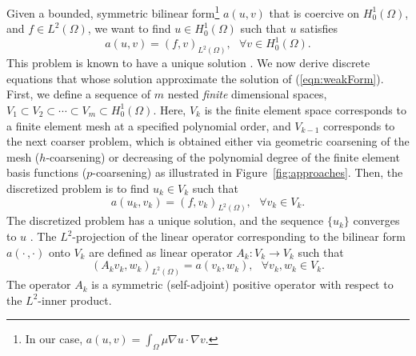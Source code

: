 \documentclass[smallcondensed,final]{svjour3}     %
\begin{document}
Given a bounded, symmetric bilinear form\footnote{In our case,
  $a(u,v)=\int_\Omega \mu\nabla u \cdot \nabla v$.} $a(u,v)$ that is
coercive
on $H_0^{1}(\Omega)$, and $f \in L^{2}(\Omega)$, we want to find $u
\in H_0^{1}(\Omega)$ such that $u$ satisfies
\begin{equation}
\label{eqn:weakForm}
a(u,v) =  (f,v)_{L^2(\Omega)}, \ \ \ \forall v \in H_0^{1}(\Omega).
\end{equation}
This problem is known to have a unique solution \cite{BrennerScott94}. 
We now derive discrete equations that whose solution 
approximate the solution of
(\ref{eqn:weakForm}). First, we define a sequence of $m$ nested {\em finite}
dimensional spaces, $V_1 \subset V_2 \subset \cdots \subset V_m \subset
H_0^{1}(\Omega)$.
Here, $V_k$ is the finite element space corresponds to a finite element mesh
at a specified
polynomial order, and $V_{k-1}$ corresponds to the next coarser
problem, which is obtained either via geometric coarsening of the
mesh ($h$-coarsening) or decreasing of the polynomial degree of the
finite element basis functions ($p$-coarsening) as illustrated in
Figure~\ref{fig:approaches}.  Then, the discretized problem is to find
$u_k \in V_k$ such that
\begin{equation*}
a(u_{k},v_k) = (f,v_k)_{L^2(\Omega)}, \ \ \ \forall v_k \in V_k.
\end{equation*}
The discretized problem has a unique solution, and the sequence
$\{u_k\}$ converges to $u$ \cite{BrennerScott94}.
%
The $L^2$-projection of the linear operator corresponding to the
bilinear form $a(\cdot\,,\cdot)$ onto $V_k$ are defined as linear
operator $A_k : V_{k} \rightarrow V_{k}$ such that
\begin{equation}
\label{eqn:fematDef}
(A_{k} v_k,w_k)_{L^2(\Omega)} = a(v_k,w_k),  \ \ \ \forall v_k,w_k \in V_k.
\end{equation}
The operator $A_k$ is a symmetric (self-adjoint) positive operator
with respect to the $L^2$-inner product.
\end{document}
